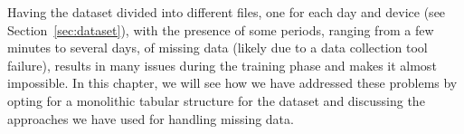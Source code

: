 Having the dataset divided into different files, one for each day
and device (see Section~\ref{sec:dataset}), with the presence of
some periods, ranging from a few minutes to several days,
of missing data (likely due to a data collection tool failure),
results in many issues during the training phase and makes it
almost impossible. In this chapter, we will see how we have
addressed these problems by opting for a monolithic tabular
structure for the dataset and discussing the approaches we have
used for handling missing data.

